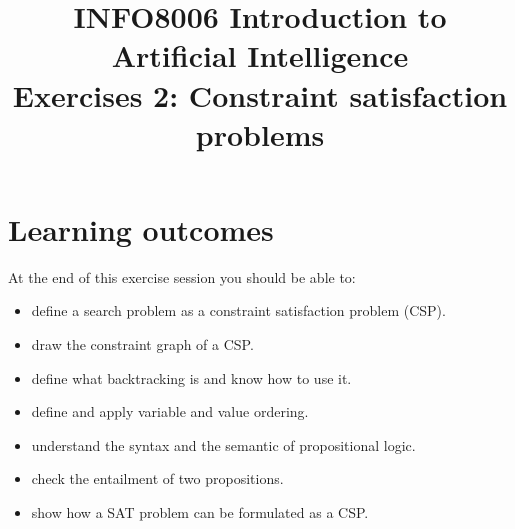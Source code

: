 \documentclass[9pt,a4paper]{extarticle}
\title{{\bf INFO8006 Introduction to Artificial Intelligence}\\[1em]
Exercises 2: Constraint satisfaction problems}
\date{}
\begin{document}
\maketitle
\vspace{-4em}

  \section*{Learning outcomes}
  At the end of this exercise session you should be able to:
  \begin{itemize}
       \item define a search problem as a constraint satisfaction problem (CSP).
       \item draw the constraint graph of a CSP.
       \item define what backtracking is and know how to use it.
       \item define and apply variable and value ordering.
       \item understand the syntax and the semantic of propositional logic.
       \item check the entailment of two propositions.
       \item show how a SAT problem can be formulated as a CSP.
       
   \end{itemize}
\end{document}
